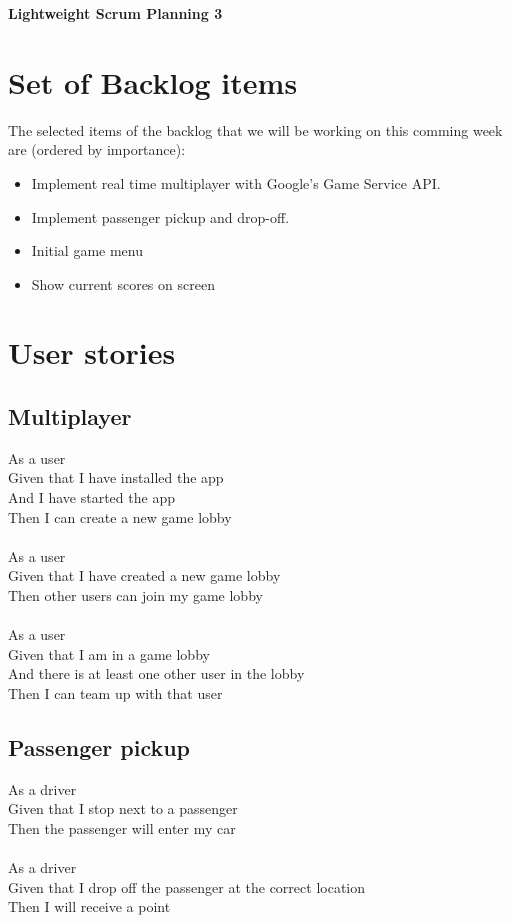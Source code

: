 \documentclass{article}
\begin{document}
\begin{minipage}[H]{\textwidth}
\vspace{0.3cm}
		\begin{center}
		\vspace{0.3cm}
			\Huge{\textbf{Lightweight Scrum Planning 3}}\\
		\vspace{0.3cm}	
		\vspace{0.7cm}		
		\end{center}
	\end{minipage}

\section*{Set of Backlog items}
The selected items of the backlog that we will be working on this comming week  are (ordered by importance):
\begin{itemize}
	\item Implement real time multiplayer with Google's Game Service API.
	\item Implement passenger pickup and drop-off.
	\item Initial game menu
	\item Show current scores on screen
\end{itemize}

\section*{User stories}
\subsection*{Multiplayer}
As a user\\
Given that I have installed the app\\
And I have started the app\\
Then I can create a new game lobby\\\\
As a user\\
Given that I have created a new game lobby\\
Then other users can join my game lobby\\\\
As a  user\\
Given that I am in a game lobby\\
And there is at least one other user in the lobby\\
Then I can team up with that user
\subsection*{Passenger pickup}
As a driver\\
Given that I stop next to a passenger\\
Then the passenger will enter my car\\\\
As a driver\\
Given that I drop off the passenger at the correct location\\
Then I will receive a point
\end{document}
